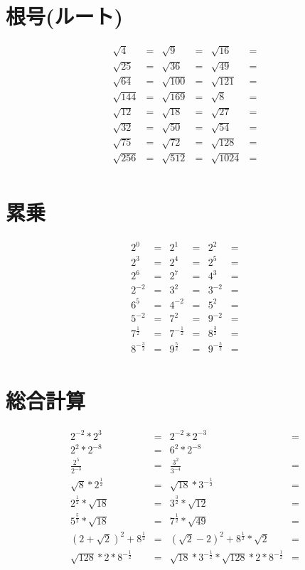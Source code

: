 \documentclass[paper=b4j,landscape,twocolumn,fleqn,10pt]{jlreq}
\begin{document}
\newpage
\section{根号(ルート)}
\begin{align*}
  \sqrt{4} &=& \sqrt{9} &=& \sqrt{16} &=\\
  \sqrt{25} &=& \sqrt{36} &=& \sqrt{49} &=\\
  \sqrt{64} &=& \sqrt{100} &=& \sqrt{121} &=\\
  \sqrt{144} &=& \sqrt{169} &=& \sqrt{8} &=\\
  \sqrt{12} &=& \sqrt{18} &=& \sqrt{27} &=\\
  \sqrt{32} &=& \sqrt{50} &=& \sqrt{54} &=\\
  \sqrt{75} &=& \sqrt{72} &=& \sqrt{128} &=\\
  \sqrt{256} &=& \sqrt{512} &=& \sqrt{1024} &=\\
\end{align*}
\section{累乗}
\begin{align*}
  2^0 &=& 2^1 &=& 2^2 &=\\
  2^3 &=& 2^4 &=& 2^5 &=\\
  2^6 &=& 2^7 &=& 4^3 &=\\
  2^{-2} &=& 3^2 &=& 3^{-2} &=\\
  6^5 &= & 4^{-2} &=& 5^2 &=\\
  5^{-2} &=& 7^2 &= & 9^{-2} &=\\
  7^{\frac{1}{2}} &= & 7^{-\frac{1}{2}} &=& 8^{\frac{3}{2}} &=\\
  8^{-\frac{3}{2}} &=& 9^{\frac{5}{2}} &= & 9^{-\frac{5}{2}} &=\\
\end{align*}
\section{総合計算}
\begin{align*}
  2^{-2}*2^3 &=& 2^{-2}*2^{-3} &=\\
  2^2*2^{-8} &=& 6^2*2^{-8} &\\
  \frac{2^5}{2^{-3}} &=& \frac{3^2}{3^{-4}} &=\\
  \sqrt{8}*2^{\frac{1}{2}} &=& \sqrt{18}*3^{-\frac{1}{2}} &=\\
  2^{\frac{1}{2}}*\sqrt{18} &=& 3^{\frac{3}{2}}*\sqrt{12} &=\\
  5^{\frac{5}{2}}*\sqrt{18} &=& 7^{\frac{1}{2}}*\sqrt{49} &=\\
  (2+\sqrt{2})^2+8^{\frac{1}{2}} &=& (\sqrt{2}-2)^2+8^{\frac{1}{2}}*\sqrt{2} &=\\
  \sqrt{128}*2*8^{-\frac{1}{2}} &=& \sqrt{18}*3^{-\frac{1}{2}}*\sqrt{128}*2*8^{-\frac{1}{2}} &=\\
\end{align*}
\end{document}
